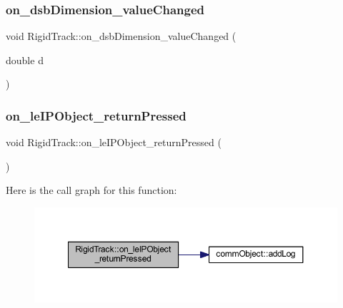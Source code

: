 \subsubsection{on\+\_\+dsb\+Dimension\+\_\+value\+Changed}
{\footnotesize\ttfamily void Rigid\+Track\+::on\+\_\+dsb\+Dimension\+\_\+value\+Changed (\begin{DoxyParamCaption}\item[{double}]{d }\end{DoxyParamCaption})\hspace{0.3cm}{\ttfamily [slot]}}

\mbox{\label{class_rigid_track_a9f037a061b2577815fc80e5e9f8d46d9}} 
\subsubsection{on\+\_\+le\+I\+P\+Object\+\_\+return\+Pressed}
{\footnotesize\ttfamily void Rigid\+Track\+::on\+\_\+le\+I\+P\+Object\+\_\+return\+Pressed (\begin{DoxyParamCaption}{ }\end{DoxyParamCaption})\hspace{0.3cm}{\ttfamily [slot]}}

Here is the call graph for this function\+:\nopagebreak
\begin{figure}[H]
\begin{center}
\leavevmode
\includegraphics[width=350pt]{class_rigid_track_a9f037a061b2577815fc80e5e9f8d46d9_cgraph}
\end{center}
\end{figure}
\mbox{\label{class_rigid_track_a555c536593d659b940de43cd2db8d6c1}} 
